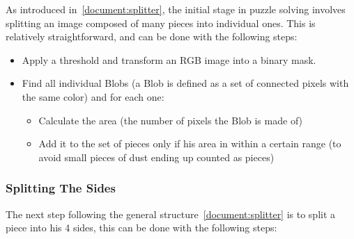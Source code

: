 \documentclass{article}
\begin{document}
As introduced in~\cref{document:splitter},  the initial stage in puzzle solving involves
splitting an image composed of many pieces into individual ones.
This is relatively straightforward, and can be done with the following steps:

\begin{itemize}
  \item Apply a threshold and transform an RGB image into a binary mask.
  \item Find all individual Blobs
  (a Blob is defined as a set of connected pixels with the same color) and for each one:

  \begin{itemize}
  \item Calculate the area (the number of pixels the Blob is made of)

  \item Add it to the set of pieces only if his area in within a certain range (to avoid small pieces of dust ending up counted as pieces)

  \end{itemize}

\end{itemize}

\subsubsection{Splitting The Sides}

The next step following the general structure~\cref{document:splitter}
is to split a piece into
his 4 sides, this can be done with the following steps:
\end{document}
